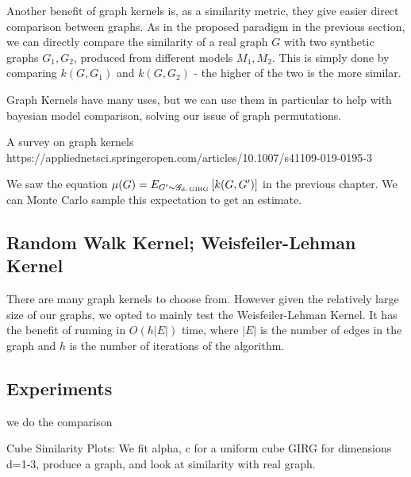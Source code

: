 Another benefit of graph kernels is, as a similarity metric, they give easier direct comparison between graphs. As in the proposed paradigm in the previous section, we can directly compare the similarity of a real graph $G$ with two synthetic graphs $G_1, G_2$, produced from different models $M_1, M_2$. This is simply done by comparing $k(G, G_1)$ and $k(G, G_2)$ - the higher of the two is the more similar.


Graph Kernels have many uses, but we can use them in particular to help with bayesian model comparison, solving our issue of graph permutations.

A survey on graph kernels https://appliednetsci.springeropen.com/articles/10.1007/s41109-019-0195-3



We saw the equation $\mu(G) = E_{G' \sim \mathscr{G}_{\text{d-}\operatorname{GIRG}}} \left [ k(G, G') \right ]$ in the previous chapter. We can Monte Carlo sample this expectation to get an estimate.

\subsection{Random Walk Kernel; Weisfeiler-Lehman Kernel}
There are many graph kernels to choose from. However given the relatively large size of our graphs, we opted to mainly test the Weisfeiler-Lehman Kernel. It has the benefit of running in $O(h|E|)$ time, where $|E|$ is the number of edges in the graph and $h$ is the number of iterations of the algorithm.

\subsection{Experiments}
we do the comparison

Cube Similarity Plots:
We fit alpha, c for a uniform cube GIRG for dimensions d=1-3, produce a graph, and look at similarity with real graph.
